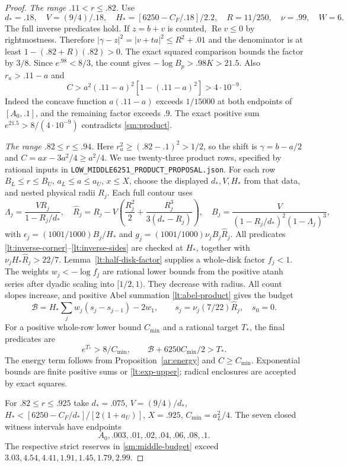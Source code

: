 \documentclass[11pt,reqno]{amsart}
\numberwithin{equation}{section}
\theoremstyle{definition}
\theoremstyle{remark}
\renewcommand{\Re}{\operatorname{Re}}
\DeclareRobustCommand{\cert}[1]{\nolinkurl{#1}}
\begin{document}
\begin{proof}
\smallskip\noindent\emph{The range $.11<r\le.82$.}
Use
\[
 d_*=.18,\quad V=(9/4)/.18,\quad
 H_*=[6250-C_F/.18]/2.2,\quad R=11/250,\quad\nu=.99,\quad W=6.
\]
The full inverse predicates hold. If $z=b+v$ is counted,
$\Re v\le0$ by rightmostness. Therefore
$|\gamma-z|^2=|v+ta|^2\le R^2+.01$ and the denominator is
at least $1-(.82+R)(.82)>0$. The exact squared comparison bounds
the factor by $3/8$. Since $e^{.98}<8/3$, the count gives
$-\log B_p>.98K>21.5$.
Also $r_a>.11-a$ and
\[
 C>a^2(.11-a)^2[1-(.11-a)^2]>4\cdot10^{-9}.
\]
Indeed the concave function $a(.11-a)$ exceeds $1/15000$ at
both endpoints of $[A_0,.1]$, and the remaining factor exceeds
$.9$. The exact positive sum $e^{21.5}>8/(4\cdot10^{-9})$
contradicts \eqref{sm:product}.

\smallskip\noindent\emph{The range $.82\le r\le.94$.}
Here $r_a^2\ge(.82-.1)^2>1/2$, so the shift is
$\gamma=b-a/2$ and $C=ax-3a^2/4\ge a^2/4$.
We use twenty-three product rows, specified by rational inputs in
\cert{LOW_MIDDLE6251_PRODUCT_PROPOSAL.json}.
For each row $B_L\le r\le B_U$, $a_L\le a\le a_U$, $x\le X$,
choose the displayed $d_*,V,H_*$ from that data, and nested
physical radii $R_j$. Each full contour uses
\[
 \Lambda_j=\frac{VR_j}{1-R_j/d_*},\quad
 \widehat R_j=R_j-V\left(\frac{R_j^2}{2}
                         +\frac{R_j^3}{3(d_*-R_j)}\right),\quad
 B_j=\frac{V}{(1-R_j/d_*)^2(1-\Lambda_j)^3},
\]
with $\epsilon_j=(1001/1000)B_j/H_*$ and
$g_j=(1001/1000)\nu_jB_j\widehat R_j$.
All predicates \eqref{lt:inverse-corner}--\eqref{lt:inverse-sides}
are checked at $H_*$, together with
$\nu_jH_*\widehat R_j>22/7$.
Lemma~\ref{lt:half-disk-factor} supplies a whole-disk factor $f_j<1$.
The weights $w_j<-\log f_j$ are rational lower bounds from the
positive atanh series after dyadic scaling into $[1/2,1)$.
They decrease with radius. All count slopes increase, and positive
Abel summation \eqref{lt:abel-product} gives the budget
\[
 \mathcal B=H_*\sum_jw_j(s_j-s_{j-1})-2w_1,\qquad
 s_j=\nu_j(7/22)\widehat R_j,\quad s_0=0.
\]
For a positive whole-row lower bound $C_{\min}$ and a rational
target $T_*$, the final predicates are
\begin{equation}\label{sm:middle-budget}
 e^{T_*}>8/C_{\min},\qquad
 \mathcal B+6250C_{\min}/2>T_*.
\end{equation}
The energy term follows from Proposition~\ref{ar:energy} and
$C\ge C_{\min}$. Exponential bounds are finite positive sums or
\eqref{lt:exp-upper}; radical enclosures are accepted by exact squares.

For $.82\le r\le.925$ take $d_*=.075$, $V=(9/4)/d_*$,
$H_*<[6250-C_F/d_*]/[2(1+a_U)]$, $X=.925$,
$C_{\min}=a_L^2/4$. The seven closed witness intervals have endpoints
\[
 A_0, .003, .01, .02, .04, .06, .08, .1.
\]
The respective strict reserves in \eqref{sm:middle-budget} exceed
$3.03,4.54,4.41,1.91,1.45,1.79,2.99$.


\end{proof}
\end{document}
